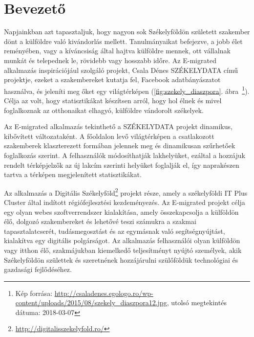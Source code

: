 \chapter*{Bevezető}

Napjainkban azt tapasztaljuk, hogy nagyon sok Székelyföldön született szakember dönt a külföldre való kivándorlás mellett. Tanulmányaikat befejezve, a jobb élet reményében, vagy a kíváncsiság által hajtva külföldre mennek, ott vállalnak munkát és telepednek le, rövidebb vagy hosszabb időre. Az E-migrated alkalmazás inspirációjául szolgáló projekt, Csala Dénes SZÉKELYDATA című projektje, ezeket a szakembereket kutatja fel, Facebook adatbányászatot használva, és jeleníti meg őket egy világtérképen (\ref{fig:szekely_diaszpora}. ábra~\footnote{Kép forrása: \url{http://csaladenes.egologo.ro/wp-content/uploads/2015/08/szekely_diaszpora12.jpg}, utolsó megtekintés dátuma: 2018-03-07}). Célja az volt, hogy statisztikákat készítsen arról, hogy hol élnek és mivel foglalkoznak az otthonaikat elhagyó, külföldre vándorolt székelyek. 

Az E-migrated alkalmazás tekinthető a SZÉKELYDATA projekt dinamikus, kibővített változataként. A főoldalon levő világtérképen a csatlakozott szakemberek klaszterezett formában jelennek meg és dinamikusan szűrhetőek foglalkozás szerint. A felhasználók módosíthatják lakhelyüket, ezáltal a hozzájuk rendelt térképjelzők az új lakcím szerinti helyüket foglalják el, így naprakészen tartva a térképen  megjelenített statisztikákat. 

Az alkalmazás a Digitális Székelyföld\footnote{\url{http://digitalisszekelyfold.ro/}} projekt része, amely  a székelyföldi IT Plus Cluster által indított régiófejlesztési kezdeményezés. Az E-migrated projekt célja egy olyan webes szoftverrendszer kialakítása, amely összekapcsolja a külföldön élő, dolgozó szakembereket és lehetővé teszi számukra a szakmai tapasztalatcserét, tudásmegosztást és az egymásnak való segítségnyújtást, kialakítva egy digitális polgárságot. Az alkalmazás felhasználói olyan külföldön vagy itthon élő, szakmájukban kiemelkedő teljesítményt nyújtó személyek, akik Székelyföldön születtek és szeretnének hozzájárulni szülőföldük technológiai és gazdasági fejlődéséhez. 

